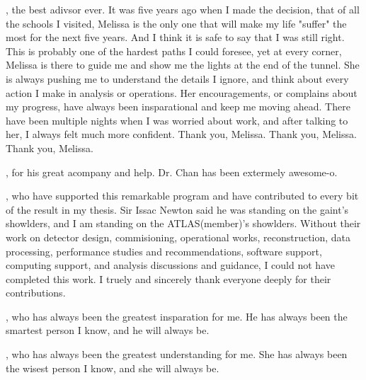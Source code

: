 
, the best adivsor ever. It was five years ago when I made the decision, that of all the schools I visited, Melissa is the only one that will make my life "suffer" the most for the next five years. And I think it is safe to say that I was still right. This is probably one of the hardest paths I could foresee, yet at every corner, Melissa is there to guide me and show me the lights at the end of the tunnel. She is always pushing me to understand the details I ignore, and think about every action I make in analysis or operations. Her encouragements, or complains about my progress, have always been insparational and keep me moving ahead. There have been multiple nights when I was worried about work, and after talking to her, I always felt much more confident. Thank you, Melissa. Thank you, Melissa. Thank you, Melissa.


, for his great acompany and help. Dr. Chan has been extermely awesome-o.

, who have supported this remarkable program and have contributed to every bit of the result in my thesis. Sir Issac Newton said he was standing on the gaint's showlders, and I am standing on the ATLAS(member)'s showlders. Without their work on detector design, commisioning, operational works, reconstruction, data processing, performance studies and recommendations, software support, computing support, and analysis discussions and guidance, I could not have completed this work. I truely and sincerely thank everyone deeply for their contributions.

, who has always been the greatest insparation for me. He has always been the smartest person I know, and he will always be.

, who has always been the greatest understanding for me. She has always been the wisest person I know, and she will always be.